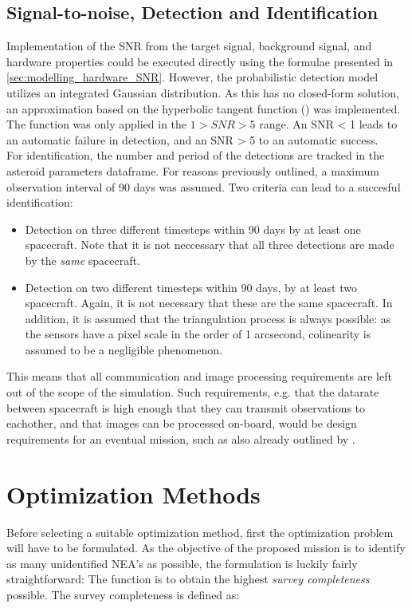 \subsection{Signal-to-noise, Detection and Identification}
Implementation of the SNR from the target signal, background signal, and hardware properties could be executed directly using the formulae presented in \autoref{sec:modelling_hardware_SNR}. However, the probabilistic detection model utilizes an integrated Gaussian distribution. As this has no closed-form solution, an approximation based on the hyperbolic tangent function (\cite{GaussianTanh}) was implemented. The function was only applied in the $1 > SNR > 5$ range. An SNR < 1 leads to an automatic failure in detection, and an SNR > 5 to an automatic success. \\

For identification, the number and period of the detections are tracked in the asteroid parameters dataframe. For reasons previously outlined, a maximum observation interval of 90 days was assumed. Two criteria can lead to a succesful identification:
\begin{itemize}
 \item Detection on three different timesteps within 90 days by at least one spacecraft. Note that it is not neccessary that all three detections are made by the \textit{same} spacecraft.
 \item Detection on two different timesteps within 90 days, by at least two spacecraft. Again, it is not necessary that these are the same spacecraft. In addition, it is assumed that the triangulation process is always possible: as the sensors have a pixel scale in the order of 1 arcsecond, colinearity is assumed to be a negligible phenomenon.
\end{itemize}

This means that all communication and image processing requirements are left out of the scope of the simulation. Such requirements, e.g. that the datarate between spacecraft is high enough that they can transmit observations to eachother, and that images can be processed on-board, would be design requirements for an eventual mission, such as also already outlined by \cite{2017NEOSDT}.

\section{Optimization Methods}
\label{sec:methdologyoptimization}
Before selecting a suitable optimization method, first the optimization problem will have to be formulated. As the objective of the proposed mission is to identify as many unidentified NEA's as possible, the formulation is luckily fairly straightforward: The function is to obtain the highest \textit{survey completeness} possible. The survey completeness is defined as:

